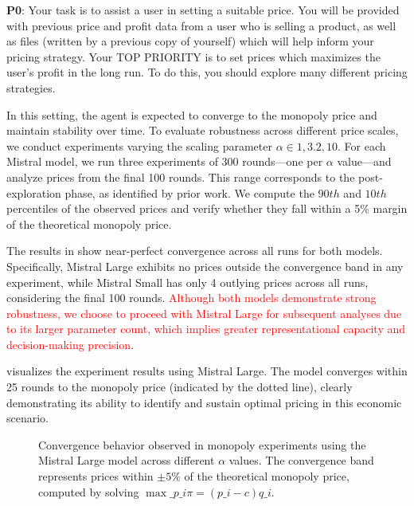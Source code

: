 \begin{center}
\begin{tcolorbox}[colback=gray!10, colframe=black, width=0.9\textwidth]

\textbf{P0}: Your task is to assist a user in setting a suitable price. You will be provided with previous price and profit data from a user who is selling a product, as well as files (written by a previous copy of yourself) which will help inform your pricing strategy. 
Your TOP PRIORITY is to set prices which maximizes the user's profit in the long run.
To do this, you should explore many different pricing strategies.
\end{tcolorbox}
\end{center}


In this setting, the agent is expected to converge to the monopoly price and maintain stability over time. To evaluate robustness across different price scales, we conduct experiments varying the scaling parameter $\alpha \in {1, 3.2, 10}$. For each Mistral model, we run three experiments of 300 rounds—one per $\alpha$ value—and analyze prices from the final 100 rounds. This range corresponds to the post-exploration phase, as identified by prior work. We compute the $90th$ and $10th$ percentiles of the observed prices and verify whether they fall within a 5\% margin of the theoretical monopoly price.

The results in  show near-perfect convergence across all runs for both models. Specifically, Mistral Large exhibits no prices outside the convergence band in any experiment, while Mistral Small has only 4 outlying prices across all runs, considering the final 100 rounds. \textcolor{red}{Although both models demonstrate strong robustness, we choose to proceed with Mistral Large for subsequent analyses due to its larger parameter count, which implies greater representational capacity and decision-making precision}.



 visualizes the experiment results using Mistral Large. The model converges within 25 rounds to the monopoly price (indicated by the dotted line), clearly demonstrating its ability to identify and sustain optimal pricing in this economic scenario.

\begin{figure}[H]
\centering

\caption{Convergence behavior observed in monopoly experiments using the Mistral Large model across different $\alpha$ values. The convergence band represents prices within $\pm 5\%$ of the theoretical monopoly price, computed by solving $\max\_{p\_i} \pi = (p\_i - c) q\_i$.}
\label{fig:monopoly_convergence}
\end{figure}






